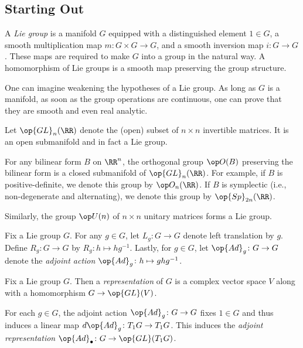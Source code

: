 \documentclass{article}
\begin{document}
\subsection{Starting Out} \label{subsec:group-start}
\begin{definition}
	A \textit{Lie group} is a manifold $G$ equipped with a distinguished element $1\in G$, a smooth multiplication map $m\colon G\times G\to G$, and a smooth inversion map $i\colon G\to G$. These maps are required to make $G$ into a group in the natural way. A homomorphism of Lie groups is a smooth map preserving the group structure.
\end{definition}
\begin{remark}
	One can imagine weakening the hypotheses of a Lie group. As long as $G$ is a manifold, as soon as the group operations are continuous, one can prove that they are smooth and even real analytic.
\end{remark}
\begin{example}
	Let $\op{GL}_n(\RR)$ denote the (open) subset of $n\times n$ invertible matrices. It is an open submanifold and in fact a Lie group.
\end{example}
\begin{example}
	For any bilinear form $B$ on $\RR^n$, the orthogonal group $\op O(B)$ preserving the bilinear form is a closed submanifold of $\op{GL}_n(\RR)$. For example, if $B$ is positive-definite, we denote this group by $\op O_n(\RR)$. If $B$ is symplectic (i.e., non-degenerate and alternating), we denote this group by $\op{Sp}_{2n}(\RR)$.
\end{example}
\begin{example}
	Similarly, the group $\op U(n)$ of $n\times n$ unitary matrices forms a Lie group.
\end{example}
\begin{notation}
	Fix a Lie group $G$. For any $g\in G$, let $L_g\colon G\to G$ denote left translation by $g$. Define $R_g\colon G\to G$ by $R_g\colon h\mapsto hg^{-1}$. Lastly, for $g\in G$, let $\op{Ad}_g\colon G\to G$ denote the \textit{adjoint action} $\op{Ad}_g\colon h\mapsto ghg^{-1}$.
\end{notation}
\begin{definition}[representation]
	Fix a Lie group $G$. Then a \textit{representation} of $G$ is a complex vector space $V$ along with a homomorphism $G\to\op{GL}(V)$.
\end{definition}
\begin{example}[adjoint]
	For each $g\in G$, the adjoint action $\op{Ad}_g\colon G\to G$ fixes $1\in G$ and thus induces a linear map $d\op{Ad}_g\colon T_1G\to T_1G$. This induces the \textit{adjoint representation} $\op{Ad}_\bullet\colon G\to\op{GL}(T_1G)$.
\end{example}
\end{document}
